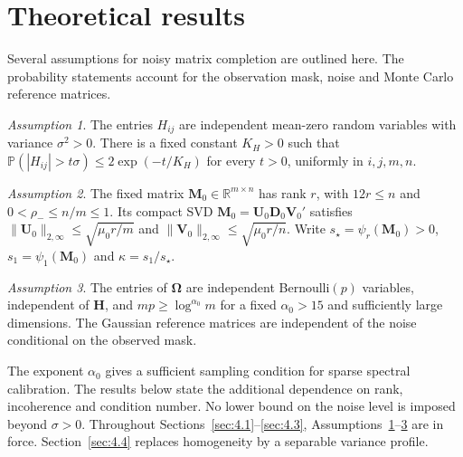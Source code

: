 \documentclass[numsec,webpdf,modern,large,namedate]{oup-authoring-template}
\theoremstyle{plain}
\theoremstyle{remark}
\newtheorem{assumption}{Assumption}
\newcommand{\M}{\bm{M}}
\newcommand{\bH}{\bm{H}}
\newcommand{\bOmega}{\bm{\Omega}}
\newcommand{\U}{\bm{U}}
\newcommand{\V}{\bm{V}}
\newif\ifmarkchanges
\newenvironment{revision}{\begingroup\ifmarkchanges\color{red}\fi}{\endgroup}
\begin{document}
\begin{revision}
\section{Theoretical results}
\label{sec:theoretical}
Several assumptions for noisy matrix completion are outlined here. The probability statements account for the observation mask, noise and Monte Carlo reference matrices.

\begin{assumption}
\label{assum:noise}\label{assum:1.a.}
The entries $H_{ij}$ are independent mean-zero random variables with
variance $\sigma^2>0$. There is a fixed constant $K_H>0$ such that
$\mathbb P(|H_{ij}|>t\sigma)\le2\exp(-t/K_H)$ for every $t>0$, uniformly
in $i,j,m,n$.
\end{assumption}
\begin{assumption}
\label{assum:target}
The fixed matrix $\M_0\in\mathbb R^{m\times n}$ has rank $r$, with
$12r\le n$ and $0<\rho_-\le n/m\le1$. Its compact SVD
$\M_0=\U_0\bm D_0\V_0'$ satisfies
$\|\U_0\|_{2,\infty}\le\sqrt{\mu_0r/m}$ and
$\|\V_0\|_{2,\infty}\le\sqrt{\mu_0r/n}$.
Write $s_\star=\psi_r(\M_0)>0$, $s_1=\psi_1(\M_0)$ and
$\kappa=s_1/s_\star$.
\end{assumption}
\begin{assumption}
\label{assum:missing}
The entries of $\bOmega$ are independent Bernoulli$(p)$ variables,
independent of $\bH$, and $mp\ge\log^{\alpha_0}m$ for a fixed
$\alpha_0>15$ and sufficiently large dimensions. The Gaussian reference
matrices are independent of the noise conditional on the observed mask.
\end{assumption}
The exponent $\alpha_0$ gives a sufficient sampling condition for sparse
spectral calibration. The results below state the additional dependence
on rank, incoherence and condition number. No lower bound on the noise level is imposed
beyond $\sigma>0$. Throughout Sections~\ref{sec:4.1}--\ref{sec:4.3},
Assumptions~\ref{assum:noise}--\ref{assum:missing} are in force.
Section~\ref{sec:4.4} replaces homogeneity by a separable variance profile.
\end{revision}
\end{document}
